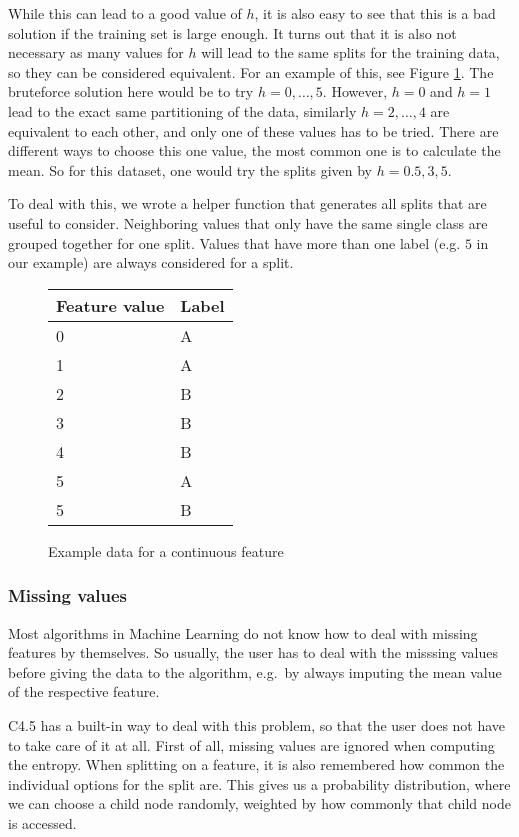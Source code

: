\documentclass[a4paper]{article}
\begin{document}
While this can lead to a good value of $h$, it is also easy to see that this is a bad solution if the training set is large enough. It turns out that it is also not necessary as many values for $h$ will lead to the same splits for the training data, so they can be considered equivalent. For an example of this, see Figure \ref{fig:continuous-feature}. The bruteforce solution here would be to try $h = 0, \dots, 5$. However, $h = 0$ and $h = 1$ lead to the exact same partitioning of the data, similarly $h = 2, \dots, 4$ are equivalent to each other, and only one of these values has to be tried. There are different ways to choose this one value, the most common one is to calculate the mean. So for this dataset, one would try the splits given by $h = 0.5, 3, 5$.

To deal with this, we wrote a helper function that generates all splits that are useful to consider. Neighboring values that only have the same single class are grouped together for one split. Values that have more than one label (e.g. $5$ in our example) are always considered for a split.

\begin{figure}
	\centering
  \begin{tabular}{l|l}
      \textbf{Feature value} & \textbf{Label} \\
      \hline
      0 & A \\
      1 & A \\
      2 & B \\
      3 & B \\
      4 & B \\
      5 & A \\
      5 & B
  \end{tabular}

  \caption{Example data for a continuous feature}
  \label{fig:continuous-feature}
\end{figure}

\subsubsection{Missing values}

Most algorithms in Machine Learning do not know how to deal with missing features by themselves. So usually, the user has to deal with the misssing values before giving the data to the algorithm, e.g.\ by always imputing the mean value of the respective feature.

C4.5 has a built-in way to deal with this problem, so that the user does not have to take care of it at all. First of all, missing values are ignored when computing the entropy. When splitting on a feature, it is also remembered how common the individual options for the split are. This gives us a probability distribution, where we can choose a child node randomly, weighted by how commonly that child node is accessed.
\end{document}
